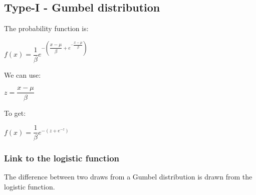 
\subsection{Type-I - Gumbel distribution}

The probability function is:

\(f(x)=\dfrac{1}{\beta }e^{-(\dfrac{x-\mu}{\beta }+e^{-\dfrac{x-\mu }{\beta }})}\)

We can use:

\(z=\dfrac{x-\mu }{\beta }\)

To get:

\(f(x)=\dfrac{1}{\beta }e^{-(z+e^{-z})}\)

\subsubsection{Link to the logistic function}

The difference between two draws from a Gumbel distribution is drawn from the logistic function.

